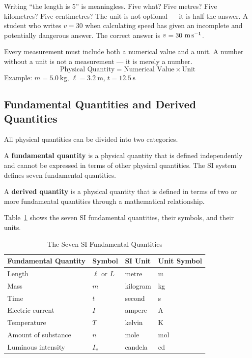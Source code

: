 Writing ``the length is 5'' is meaningless. Five what? Five
metres? Five kilometres? Five centimetres? The unit is not
optional --- it is half the answer. A student who writes
$v = 30$ when calculating speed has given an incomplete and
potentially dangerous answer. The correct answer is
$v = 30\ \text{m\,s}^{-1}$.

\begin{keybox}[Physical Quantity = Number + Unit]
Every measurement must include both a numerical value and
a unit. A number without a unit is not a measurement --- it
is merely a number.
\[
  \text{Physical Quantity} = \text{Numerical Value}
  \times \text{Unit}
\]
Example: $m = 5.0\ \text{kg}$, $\ell = 3.2\ \text{m}$,
$t = 12.5\ \text{s}$
\end{keybox}

\subsection{Fundamental Quantities and Derived Quantities}

All physical quantities can be divided into two categories.

\begin{definitionbox}
A \textbf{fundamental quantity} is a physical quantity that is
defined independently and cannot be expressed in terms of
other physical quantities. The SI system defines seven fundamental
quantities.
\end{definitionbox}

\begin{definitionbox}
A \textbf{derived quantity} is a physical quantity that is
defined in terms of two or more fundamental quantities through a
mathematical relationship.
\end{definitionbox}

Table~\ref{tab:si_base} shows the seven SI fundamental quantities,
their symbols, and their units.

\begin{table}[H]
\centering
\caption{The Seven SI Fundamental Quantities}
\label{tab:si_base}
\begin{tabular}{llll}
\toprule
\textbf{Fundamental Quantity} & \textbf{Symbol} &
\textbf{SI Unit} & \textbf{Unit Symbol}\\
\midrule
Length          & $\ell$ or $L$ & metre      & m\\
Mass            & $m$           & kilogram   & kg\\
Time            & $t$           & second     & s\\
Electric current& $I$           & ampere     & A\\
Temperature     & $T$           & kelvin     & K\\
Amount of substance & $n$       & mole       & mol\\
Luminous intensity & $I_v$      & candela    & cd\\
\bottomrule
\end{tabular}
\end{table}

